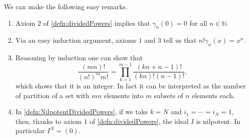 \documentclass[../Main]{subfiles}
\begin{document}
\begin{rem}[]
	We can make the following easy remarks.
\begin{enumerate}
\item Axiom $2$ of \cref{defn:dividedPowers}
	implies that $\gamma_n(0) = 0$ for all $n \in \mathbb{N}$.

\item Via an easy induction argument, axioms $1$ and $3$ tell us that
	$n! \gamma_n(x) = x^n$.

\item Reasoning by induction one can show that
	\begin{equation*}
		\frac{\left( mn \right)!}{\left( n! \right)^m m!} =
		\prod_{k=1}^{m-1} \frac{\left( kn + n - 1 \right)!}{(kn)! (n-1)!}
	,\end{equation*}
	which shows that it is an integer.
	In fact it can be interpreted as the number of partition of a set with $mn$
	elements into $m$ subsets of $n$ elements each.

\item In \cref{defn:NilpotentDividedPowers},
	if we take $k = N$ and $i_1 = \cdots = i_N = 1$,
	then, thanks to axiom $1$ of \cref{defn:dividedPowers}, the ideal $I$
	is nilpotent.
	In particular $I^N = (0)$.
\end{enumerate}
\end{rem}
\end{document}
